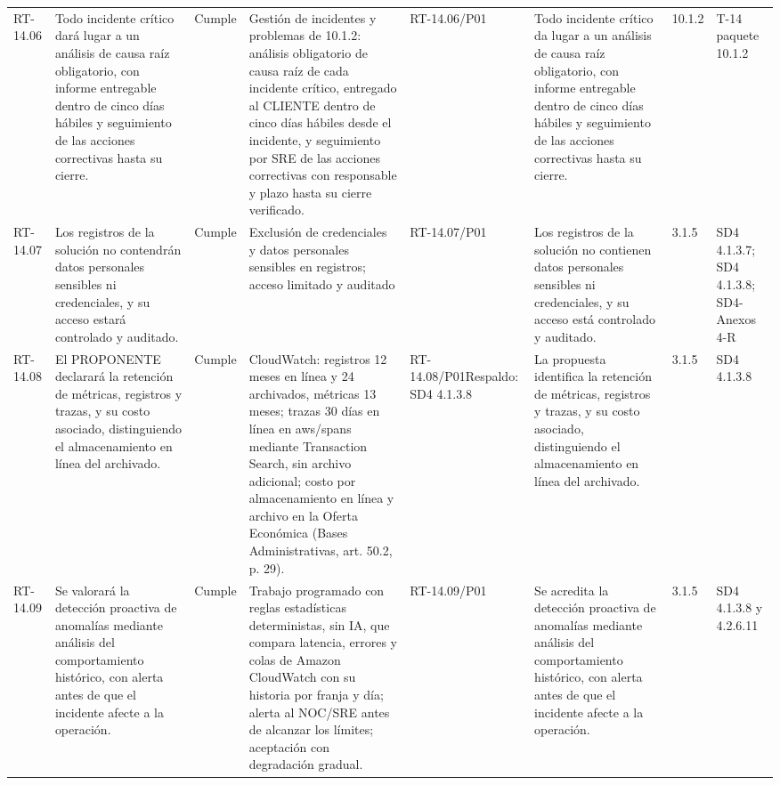 \documentclass[oficio,firma,final]{lafrox}
\begin{document}
\begin{landscape}
{\begin{longtable}{@{}F{0.054} F{0.173} F{0.061} F{0.191} F{0.106} F{0.180} F{0.067} F{0.168}@{}}
  RT-14.06 & Todo incidente crítico dará lugar a un análisis de causa raíz obligatorio, con informe entregable dentro de cinco días hábiles y seguimiento de las acciones correctivas hasta su cierre. & Cumple & Gestión de incidentes y problemas de 10.1.2: análisis obligatorio de causa raíz de cada incidente crítico, entregado al CLIENTE dentro de cinco días hábiles desde el incidente, y seguimiento por SRE de las acciones correctivas con responsable y plazo hasta su cierre verificado. & RT-14.06/\allowbreak{}P01 & Todo incidente crítico da lugar a un análisis de causa raíz obligatorio, con informe entregable dentro de cinco días hábiles y seguimiento de las acciones correctivas hasta su cierre. & 10.1.2 & T-14 paquete 10.1.2  \\
  RT-14.07 & Los registros de la solución no contendrán datos personales sensibles ni credenciales, y su acceso estará controlado y auditado. & Cumple & Exclusión de credenciales y datos personales sensibles en registros; acceso limitado y auditado & RT-14.07/\allowbreak{}P01 & Los registros de la solución no contienen datos personales sensibles ni credenciales, y su acceso está controlado y auditado. & 3.1.5 & SD4 4.1.3.7; SD4 4.1.3.8; SD4-Anexos 4-R  \\
  RT-14.08 & El PROPONENTE declarará la retención de métricas, registros y trazas, y su costo asociado, distinguiendo el almacenamiento en línea del archivado. & Cumple & CloudWatch: registros 12 meses en línea y 24 archivados, métricas 13 meses; trazas 30 días en línea en aws/spans mediante Transaction Search, sin archivo adicional; costo por almacenamiento en línea y archivo en la Oferta Económica (Bases Administrativas, art. 50.2, p. 29). & RT-14.08/\allowbreak{}P01\newline Respaldo: SD4 4.1.3.8 & La propuesta identifica la retención de métricas, registros y trazas, y su costo asociado, distinguiendo el almacenamiento en línea del archivado. & 3.1.5 & SD4 4.1.3.8  \\
  RT-14.09 & Se valorará la detección proactiva de anomalías mediante análisis del comportamiento histórico, con alerta antes de que el incidente afecte a la operación. & Cumple & Trabajo programado con reglas estadísticas deterministas, sin IA, que compara latencia, errores y colas de Amazon CloudWatch con su historia por franja y día; alerta al NOC/SRE antes de alcanzar los límites; aceptación con degradación gradual. & RT-14.09/\allowbreak{}P01 & Se acredita la detección proactiva de anomalías mediante análisis del comportamiento histórico, con alerta antes de que el incidente afecte a la operación. & 3.1.5 & SD4 4.1.3.8 y 4.2.6.11  \\

\end{longtable}}
\end{landscape}
\end{document}

